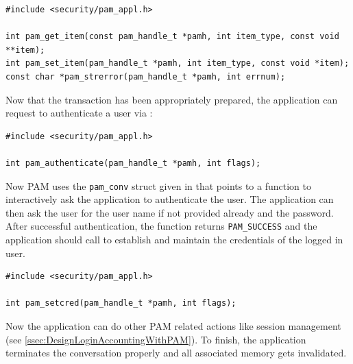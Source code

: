 \documentclass[10pt,a4paper,titlepage,twoside,english,final]{zhawreprt}
\begin{document}
\setlistingC
\begin{lstlisting}[caption={\gls{PAM} functions},label=lst:PAMFunctions]
#include <security/pam_appl.h>

int pam_get_item(const pam_handle_t *pamh, int item_type, const void **item);
int pam_set_item(pam_handle_t *pamh, int item_type, const void *item);
const char *pam_strerror(pam_handle_t *pamh, int errnum);
\end{lstlisting}

Now that the transaction has been appropriately prepared, the application can request to authenticate a user via \cite{pam_authenticate}:

\setlistingC
\begin{lstlisting}[caption={\gls{PAM} authentication},label=lst:PAMAuthentication]
#include <security/pam_appl.h>

int pam_authenticate(pam_handle_t *pamh, int flags);
\end{lstlisting}

Now \gls{PAM} uses the \texttt{pam\_conv} struct given in \cite{pam_start} that points to a function to interactively ask the application to authenticate the user.
The application can then ask the user for the user name if not provided already and the password.
After successful authentication, the function returns \texttt{PAM\_SUCCESS} and the application should call \cite{pam_setcred} to establish and maintain the credentials of the logged in user.

\setlistingC
\begin{lstlisting}[caption={\gls{PAM} credential setting},label=lst:PAMCredSet]
#include <security/pam_appl.h>

int pam_setcred(pam_handle_t *pamh, int flags);
\end{lstlisting}

Now the application can do other \gls{PAM} related actions like session management (see \ref{ssec:DesignLoginAccountingWithPAM}).
To finish, the application terminates the conversation properly and all associated memory gets invalidated.
\end{document}
